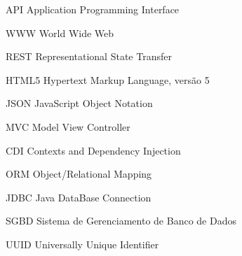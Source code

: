 \begin{siglas}
  \item[API] Application Programming Interface
  \item[WWW] World Wide Web
  \item[REST] Representational State Transfer
  \item[HTML5] Hypertext Markup Language, versão 5
  \item[JSON] JavaScript Object Notation
  \item[MVC] Model View Controller
  \item[CDI] Contexts and Dependency Injection
  \item[ORM] Object/Relational Mapping
  \item[JDBC] Java DataBase Connection
  \item[SGBD] Sistema de Gerenciamento de Banco de Dados
  \item[UUID] Universally Unique Identifier
\end{siglas}